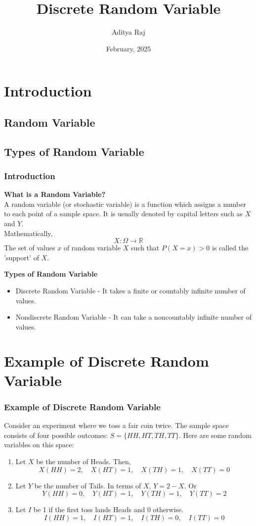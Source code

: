 \documentclass{beamer}
\title{Discrete Random Variable}
\author{Aditya Raj}
\institute{GKCIET, Malda \\ Department of Computer Science and Engineering  \\ Roll No: 35530824051}
\date{February, 2025}
\begin{document}
\begin{frame}
    \titlepage
\end{frame}

\begin{frame}
    \tableofcontents
\end{frame}

\section{Introduction}
\subsection{Random Variable}
\subsection{Types of Random Variable}
\begin{frame}
    \frametitle{Introduction}
    \textbf{What is a Random Variable?} \\
    A random variable (or stochastic variable) is a function which assigns a number to each point of a sample space. It is usually denoted by capital letters such as $X$ and $Y$. \\
    Mathematically, \\
    $$X: \Omega \rightarrow \mathbb{R}$$
    The set of values $x$ of random variable $X$ such that $P(X= x) > 0$ is called the 'support' of $X$.

    \textbf{Types of Random Variable}
    \begin{itemize}
        \item Discrete Random Variable - It takes a finite or countably infinite number of values.
        \item Nondiscrete Random Variable - It can take a noncountably infinite number of values.
    \end{itemize}
\end{frame}

\section{Example of Discrete Random Variable}
\begin{frame}
    \frametitle{Example of Discrete Random Variable}
    Consider an experiment where we toss a fair coin twice. The sample space consists of four possible outcomes: $S = \{HH, HT, TH, TT\}$. Here are some random variables on this space:
    \begin{enumerate}
        \item Let $X$ be the number of Heads. Then,
        $$X(HH) = 2, \quad X(HT) = 1, \quad X(TH) = 1, \quad X(TT) = 0$$
        \item Let $Y$ be the number of Tails. In terms of $X$, $Y = 2 - X$. Or
        $$Y(HH) = 0, \quad Y(HT) = 1, \quad Y(TH) = 1, \quad Y(TT) = 2$$
        \item Let $I$ be 1 if the first toss lands Heads and 0 otherwise.
        $$I(HH) = 1, \quad I(HT) = 1, \quad I(TH) = 0, \quad I(TT) = 0$$
    \end{enumerate}

\end{frame}
\end{document}
